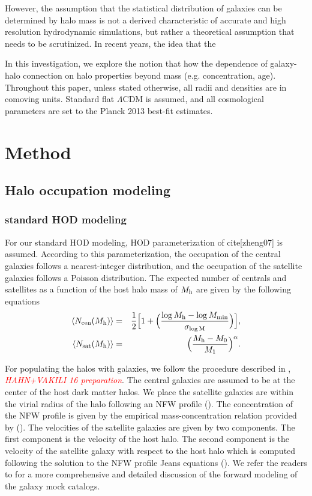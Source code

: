 \documentclass[12pt, preprint]{emulateapj}
\newcommand{\todo}[1]{{\em \textcolor{red}{ #1}}}
\begin{document}
However, the assumption that the statistical 
distribution of galaxies can be determined by halo mass is not a derived characteristic of accurate and high resolution hydrodynamic simulations, but rather a theoretical assumption that needs to be scrutinized. In recent years, the idea that the   

In this investigation, we explore the notion that how the dependence of 
galaxy-halo connection on halo properties beyond mass (e.g. concentration, age).
Throughout this paper, unless stated otherwise, 
all radii and densities are in comoving units. Standard flat $\Lambda$CDM is assumed, 
and all cosmological parameters are set to the Planck 2013 best-fit estimates.

\section{Method}
\subsection{Halo occupation modeling}
\subsubsection{standard HOD modeling}\label{subsubsec:hod}
For our standard HOD modeling, HOD parameterization of cite[zheng07] is assumed. According to this parameterization, the occupation of the central galaxies follows a nearest-integer distribution, 
and the occupation of the satellite galaxies follows a Poisson distribution. The expected number of centrals and satellites as a function of the host halo mass of $M_{\rm h}$ are given by the following equations 
\begin{eqnarray}
\langle N_{\rm cen}(M_{\rm h}) \rangle &=& \frac{1}{2}\Big[1+\Big(\frac{\log M_{\rm h} - \log M_{\rm min}}{\sigma_{\log \rm{M}}} \Big) \Big], \label{hod:central}\\ 
\langle N_{\rm sat}(M_{\rm h}) \rangle &=& \Big( \frac{M_{\rm h} - M_{\rm{0}}}{M_{\rm 1}} \Big)^{\alpha}. \label{hod:satellite}
\end{eqnarray}

For populating the halos with galaxies, we follow the procedure described in \citealt{decorated}, \todo{HAHN+VAKILI 16 preparation}. The central galaxies are assumed to be at the center of the host dark matter halos. We place the satellite galaxies are within the virial radius of the halo following an NFW profile (\citealt{nfw}). The concentration of the NFW profile is given by the empirical mass-concentration relation provided by (\citealt{nfw_c(M)}). The velocities of the satellite galaxies are given by two components. The first component is the velocity of the host halo. The second component is the velocity of the satellite galaxy with respect to the host halo which is computed following the solution to the NFW profile Jeans equations (\citealt{more2010}). We refer the readers to \citealt{decorated} for a more comprehensive and detailed discussion of the forward modeling of the galaxy mock catalogs.
\end{document}
